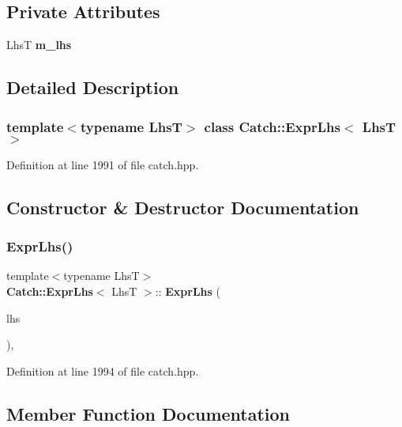 \subsection*{Private Attributes}
\begin{DoxyCompactItemize}
\item 
LhsT \textbf{ m\+\_\+lhs}
\end{DoxyCompactItemize}


\subsection{Detailed Description}
\subsubsection*{template$<$typename LhsT$>$\newline
class Catch\+::\+Expr\+Lhs$<$ Lhs\+T $>$}



Definition at line 1991 of file catch.\+hpp.



\subsection{Constructor \& Destructor Documentation}
\mbox{\label{class_catch_1_1_expr_lhs_ad22c6af1a7d6993240624d299714a479}} 
\subsubsection{ExprLhs()}
{\footnotesize\ttfamily template$<$typename LhsT$>$ \\
\textbf{ Catch\+::\+Expr\+Lhs}$<$ LhsT $>$\+::\textbf{ Expr\+Lhs} (\begin{DoxyParamCaption}\item[{LhsT}]{lhs }\end{DoxyParamCaption})\hspace{0.3cm}{\ttfamily [inline]}, {\ttfamily [explicit]}}



Definition at line 1994 of file catch.\+hpp.



\subsection{Member Function Documentation}
\mbox{\label{class_catch_1_1_expr_lhs_ab68bd6d5d3ae21b7fba9010150fba95d}} 
